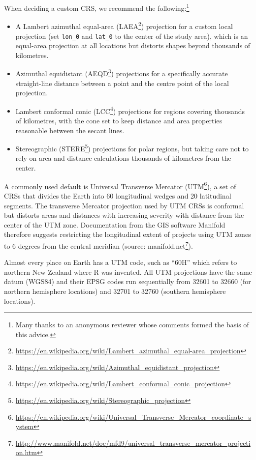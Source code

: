 \documentclass[]{krantz}
\providecommand{\tightlist}{%
  \setlength{\itemsep}{0pt}\setlength{\parskip}{0pt}}
\let\rmarkdownfootnote\footnote%
\def\footnote{\protect\rmarkdownfootnote}
\renewcommand{\href}[2]{#2\footnote{\url{#1}}}
\begin{document}
When deciding a custom CRS, we recommend the following:\footnote{Many thanks to an anonymous reviewer whose comments formed the basis of this advice.}

\begin{itemize}
\tightlist
\item
  A Lambert azimuthal equal-area (\href{https://en.wikipedia.org/wiki/Lambert_azimuthal_equal-area_projection}{LAEA}) projection for a custom local projection (set \texttt{lon\_0} and \texttt{lat\_0} to the center of the study area), which is an equal-area projection at all locations but distorts shapes beyond thousands of kilometres.
\item
  Azimuthal equidistant (\href{https://en.wikipedia.org/wiki/Azimuthal_equidistant_projection}{AEQD}) projections for a specifically accurate straight-line distance between a point and the centre point of the local projection.
\item
  Lambert conformal conic (\href{https://en.wikipedia.org/wiki/Lambert_conformal_conic_projection}{LCC}) projections for regions covering thousands of kilometres, with the cone set to keep distance and area properties reasonable between the secant lines.
\item
  Stereographic (\href{https://en.wikipedia.org/wiki/Stereographic_projection}{STERE}) projections for polar regions, but taking care not to rely on area and distance calculations thousands of kilometres from the center.
\end{itemize}

A commonly used default is Universal Transverse Mercator (\href{https://en.wikipedia.org/wiki/Universal_Transverse_Mercator_coordinate_system}{UTM}), a set of CRSs that divides the Earth into 60 longitudinal wedges and 20 latitudinal segments.
The transverse Mercator projection used by UTM CRSs is conformal but distorts areas and distances with increasing severity with distance from the center of the UTM zone.
Documentation from the GIS software Manifold therefore suggests restricting the longitudinal extent of projects using UTM zones to 6 degrees from the central meridian (source: \href{http://www.manifold.net/doc/mfd9/universal_transverse_mercator_projection.htm}{manifold.net}).

Almost every place on Earth has a UTM code, such as ``60H'' which refers to northern New Zealand where R was invented.
All UTM projections have the same datum (WGS84) and their EPSG codes run sequentially from 32601 to 32660 (for northern hemisphere locations) and 32701 to 32760 (southern hemisphere locations).
\end{document}
